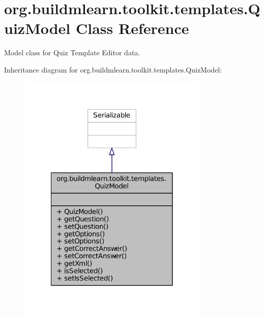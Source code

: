 \hypertarget{classorg_1_1buildmlearn_1_1toolkit_1_1templates_1_1QuizModel}{\section{org.\-buildmlearn.\-toolkit.\-templates.\-Quiz\-Model Class Reference}
\label{classorg_1_1buildmlearn_1_1toolkit_1_1templates_1_1QuizModel}
}


Model class for Quiz Template Editor data.  




Inheritance diagram for org.\-buildmlearn.\-toolkit.\-templates.\-Quiz\-Model\-:
\nopagebreak
\begin{figure}[H]
\begin{center}
\leavevmode
\includegraphics[width=258pt]{dc/d18/classorg_1_1buildmlearn_1_1toolkit_1_1templates_1_1QuizModel__inherit__graph}
\end{center}
\end{figure}


